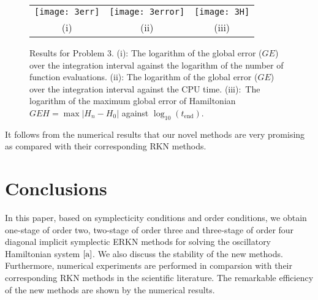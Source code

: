 \documentclass{article}
\begin{document}
\begin{figure}[ptbh]
\centering\tabcolsep=1mm
\begin{tabular}
[c]{ccc}%
\texttt{[image: 3err]} & \texttt{[image: 3error]} & \texttt{[image: 3H]}\\
{\small (i)} & {\small (ii)} & {\small (iii)}%
\end{tabular}
\caption{Results for Problem 3. (i): The logarithm of the global
error ($GE$) over the integration interval against the logarithm of
the number of function evaluations. (ii): The logarithm of the
global error ($GE$) over the integration interval against the CPU
time. (iii):\ The logarithm of the maximum global error of
Hamiltonian
$GEH=\max|H_{n}-H_{0}|$ against $\log_{10}(t_{\mathrm{end}})$.}%
\label{fig:problem3}%
\end{figure}
It follows from the numerical results that our novel methods are
very promising as compared with their corresponding RKN methods.
\section{Conclusions}\label{five}
In this paper,  based on symplecticity conditions and order
conditions, we obtain one-stage of order two, two-stage of order
three and three-stage of order  four diagonal implicit symplectic
ERKN methods
  for solving the oscillatory Hamiltonian system
$\eqref{a}$. We also discuss the stability of the new methods.
Furthermore, numerical experiments are performed in comparsion with
their corresponding RKN methods in the scientific literature. The
remarkable efficiency of the new methods are shown by the numerical
results.
\end{document}
